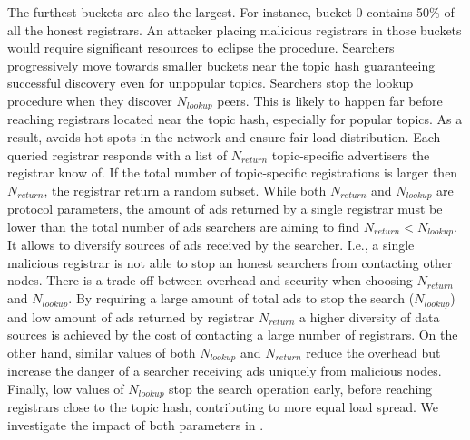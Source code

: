 The furthest buckets are also the largest. For instance, bucket 0 contains 50\% of all the honest registrars. An attacker placing malicious registrars in those buckets would require significant resources to eclipse the procedure. Searchers progressively move towards smaller buckets near the topic hash guaranteeing successful discovery even for unpopular topics.
Searchers stop the lookup procedure when they discover $N_\textit{lookup}$ peers. This is likely to happen far before reaching registrars located near the topic hash, especially for popular topics. As a result, \sysname avoids hot-spots in the network and ensure fair load distribution. 
Each queried registrar responds with a list of $N_\textit{return}$ topic-specific advertisers the registrar know of. If the total number of topic-specific registrations is larger then $N_\textit{return}$, the registrar return a random subset. While both $N_\textit{return}$ and $N_\textit{lookup}$ are protocol parameters, the amount of ads returned by a single registrar must be lower than the total number of ads searchers are aiming to find $N_\textit{return} < N_\textit{lookup}$. It allows to diversify sources of ads received by the searcher. I.e., a single malicious registrar is not able to stop an honest searchers from contacting other nodes.
There is a trade-off between overhead and security when choosing $N_\textit{return}$ and $N_\textit{lookup}$. 
By requiring a large amount of total ads to stop the search ($N_\textit{lookup}$) and low amount of ads returned by registrar $N_\textit{return}$ a higher diversity of data sources is achieved by the cost of contacting a large number of registrars. On the other hand, similar values of both $N_\textit{lookup}$ and $N_\textit{return}$ reduce the overhead but increase the danger of a searcher receiving ads uniquely from malicious nodes. Finally, low values of $N_\textit{lookup}$ stop the search operation early,  before reaching registrars close to the topic hash, contributing to more equal load spread. We investigate the impact of both parameters in .

